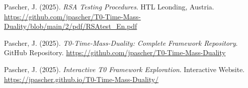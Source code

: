 \documentclass{article}
\begin{document}
\begin{thebibliography}{99}
		Pascher, J. (2025).
		\textit{RSA Testing Procedures}.
		HTL Leonding, Austria.
		\url{https://github.com/jpascher/T0-Time-Mass-Duality/blob/main/2/pdf/RSAtest_En.pdf}
		
		
		Pascher, J. (2025).
		\textit{T0-Time-Mass-Duality: Complete Framework Repository}.
		GitHub Repository.
		\url{https://github.com/jpascher/T0-Time-Mass-Duality}
		
		Pascher, J. (2025).
		\textit{Interactive T0 Framework Exploration}.
		Interactive Website.
		\url{https://jpascher.github.io/T0-Time-Mass-Duality/}
		
	\end{thebibliography}
	
\end{document}
